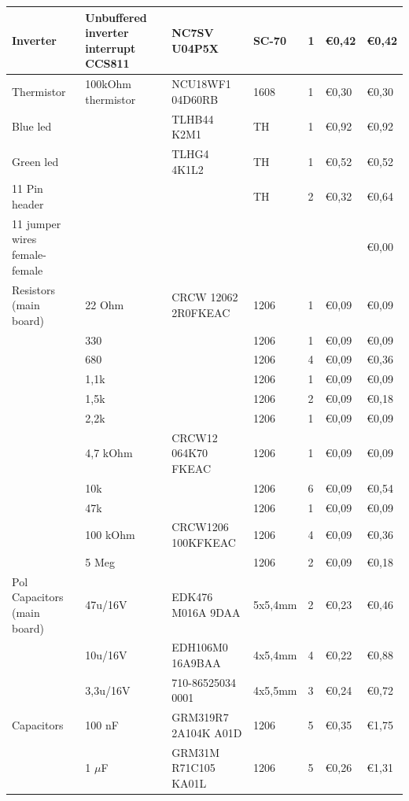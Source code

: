 \documentclass[11pt,a4paper]{article}
\begin{document}
\begin{longtable}{|p{}|p{}||p{}|p{}||p{}|p{}||p{}|}
        Inverter & Unbuffered inverter interrupt CCS811 & NC7SV U04P5X & SC-70 & 1 & \euro 0,42 & \euro 0,42 \\ \hline
        Thermistor & 100kOhm thermistor & NCU18WF1 04D60RB & 1608 & 1 & \euro 0,30 & \euro 0,30 \\ \hline
        Blue led &  & TLHB44 K2M1 & TH & 1 & \euro 0,92 & \euro 0,92 \\ \hline
        Green led &  & TLHG4 4K1L2 & TH & 1 & \euro 0,52 & \euro 0,52 \\ \hline
        11 Pin header &  &  & TH & 2 & \euro 0,32 & \euro 0,64 \\ \hline
        11 jumper wires female-female &  &  &  &  &  & \euro 0,00 \\ \hline
        Resistors (main board) & 22 Ohm & CRCW 12062 2R0FKEAC & 1206 & 1 & \euro 0,09 & \euro 0,09 \\ \hline
         & 330 &  & 1206 & 1 & \euro 0,09 & \euro 0,09 \\ \hline
         & 680 &  & 1206 & 4 & \euro 0,09 & \euro 0,36 \\ \hline
         & 1,1k &  & 1206 & 1 & \euro 0,09 & \euro 0,09 \\ \hline
         & 1,5k &  & 1206 & 2 & \euro 0,09 & \euro 0,18 \\ \hline
         & 2,2k &  & 1206 & 1 & \euro 0,09 & \euro 0,09 \\ \hline
         & 4,7 kOhm & CRCW12 064K70 FKEAC & 1206 & 1 & \euro 0,09 & \euro 0,09 \\ \hline
         & 10k &  & 1206 & 6 & \euro 0,09 & \euro 0,54 \\ \hline
         & 47k &  & 1206 & 1 & \euro 0,09 & \euro 0,09 \\ \hline
         & 100 kOhm & CRCW1206 100KFKEAC  & 1206 & 4 & \euro 0,09 & \euro 0,36 \\ \hline
         & 5 Meg &  & 1206 & 2 & \euro 0,09 & \euro 0,18 \\ \hline
        Pol Capacitors (main board) & 47u/16V & EDK476 M016A 9DAA & 5x5,4mm & 2 & \euro 0,23 & \euro 0,46 \\ \hline
         & 10u/16V & EDH106M0 16A9BAA & 4x5,4mm & 4 & \euro 0,22 & \euro 0,88 \\ \hline
         & 3,3u/16V & 710-86525034 0001 & 4x5,5mm & 3 & \euro 0,24 & \euro 0,72 \\ \hline
        Capacitors & 100 nF & GRM319R7 2A104K A01D & 1206 & 5 & \euro 0,35 & \euro 1,75 \\ \hline
         & 1 $\mu$F & GRM31M R71C105 KA01L & 1206 & 5 & \euro 0,26 & \euro 1,31 \\ \hline

\end{longtable}
\end{document}
